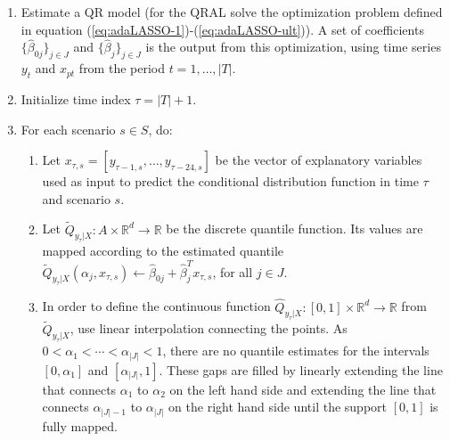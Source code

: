 \begin{enumerate}
	
	\item Estimate a QR model (for the QRAL solve the optimization problem defined in equation (\ref{eq:adaLASSO-1})-(\ref{eq:adaLASSO-ult})). 
	A set of coefficients $\{ \hat\beta_{0j} \}_{j \in J}$ and $\{ \hat\beta_{j} \}_{j \in J}$ is the output from this optimization, using time series $y_t$ and $x_{pt}$ from the period $t = 1, \dots, |T|$. 

	\item Initialize time index $\tau = |T| + 1$.
	
	\item For each scenario $s \in S$, do:
		\begin{enumerate}

		\item Let $x_{\tau,s} = [y_{\tau-1,s}, \dots, y_{\tau-24,s}]$ be the vector of explanatory variables used as input to predict the conditional distribution function in time $\tau$ and scenario $s$.

		\item Let $\tilde{Q}_{y_{\tau}|X}:A \times \mathbb{R}^d \rightarrow \mathbb{R}$ be the discrete quantile function. Its values are mapped according to the estimated quantile $\tilde Q_{y_{\tau}|X}(\alpha_j, x_{\tau,s}) \leftarrow \hat\beta_{0j} + \hat\beta_j^T x_{\tau,s}$, for all $j \in J$.
		
		\item In order to define the continuous function $\hat{Q}_{y_{\tau}|X}:[0,1] \times \mathbb{R}^d \rightarrow \mathbb{R}$ from $\tilde Q_{y_{\tau}|X}$, use linear interpolation connecting the points. As $0 < \alpha_1 < \cdots < \alpha_{|J|} < 1$, there are no quantile estimates for the intervals $[0,\alpha_1]$ and $[\alpha_{|J|},1]$. These gaps are filled by linearly extending the line that connects $\alpha_1$ to $\alpha_2$ on the left hand side and extending the line that connects $\alpha_{|J|-1}$ to $\alpha_{|J|}$ on the right hand side until the support $[0,1]$ is fully mapped.  

		

\end{enumerate}
\end{enumerate}
